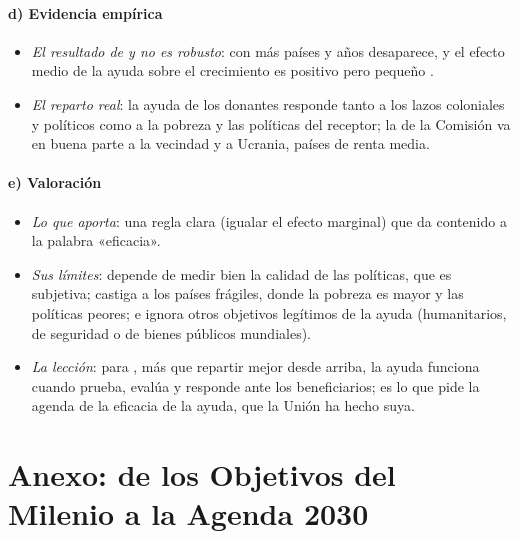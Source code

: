 \documentclass[11pt]{article}
\begin{document}
\paragraph{d) Evidencia empírica}

\begin{itemize}
\item \emph{El resultado de  y  no es robusto}: con más países y años desaparece\nocite{EasterlyLevineRoodman2004}, y el efecto medio de la ayuda sobre el crecimiento es positivo pero pequeño .
\item \emph{El reparto real}: la ayuda de los donantes responde tanto a los lazos coloniales y políticos como a la pobreza y las políticas del receptor\nocite{AlesinaDollar2000}; la de la Comisión va en buena parte a la vecindad y a Ucrania, países de renta media.
\end{itemize}

\paragraph{e) Valoración}

\begin{itemize}
\item \emph{Lo que aporta}: una regla clara (igualar el efecto marginal) que da contenido a la palabra «eficacia».
\item \emph{Sus límites}: depende de medir bien la calidad de las políticas, que es subjetiva; castiga a los países frágiles, donde la pobreza es mayor y las políticas peores; e ignora otros objetivos legítimos de la ayuda (humanitarios, de seguridad o de bienes públicos mundiales).
\item \emph{La lección}: para , más que repartir mejor desde arriba, la ayuda funciona cuando prueba, evalúa y responde ante los beneficiarios\nocite{Easterly2006}; es lo que pide la agenda de la eficacia de la ayuda, que la Unión ha hecho suya.
\end{itemize}

\section{Anexo: de los Objetivos del Milenio a la Agenda 2030}\label{anexo:odm}
\end{document}
